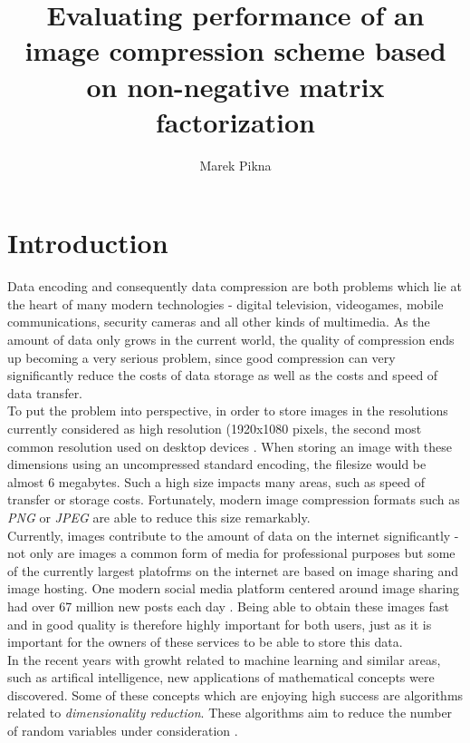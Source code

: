 \documentclass[thesis=M,english]{FITthesis}[2012/10/20]
\title{Evaluating performance of an image compression scheme based on non-negative matrix factorization}
\author{Marek Pikna} %
\begin{document}

\chapter{Introduction}
Data encoding and consequently data compression are both problems which lie
at the heart of many modern technologies - digital television, videogames, mobile
communications, security cameras and all other kinds of multimedia. As the amount
of data only grows in the current world, the quality of
compression ends up becoming a very serious problem, since good compression can
very significantly reduce the costs of data storage as well as the costs and speed
of data transfer.
\\

To put the problem into perspective, in order to store images in the resolutions
currently considered as high resolution (1920x1080 pixels, the second most common
resolution used on desktop devices \cite{res-stats}.
When storing an image with these dimensions using an uncompressed standard encoding,
the filesize would be almost 6 megabytes. Such a high size impacts many areas, such as
speed of transfer or storage costs. Fortunately, modern image compression formats such as
\emph{PNG} or \emph{JPEG} are able to reduce this size remarkably.
\\

Currently, images contribute to the amount of data on the internet significantly - not only are images a common
form of media for professional purposes but some of the currently largest platofrms on the
internet are based on image sharing and image hosting. One modern social media platform centered around image
sharing had over 67 million new posts each day \cite{data-amount}.
Being able to obtain these images fast and in good quality is therefore highly important for both users, just
as it is important for the owners of these services to be able to store this data.
\\

In the recent years with growht related to machine learning and similar areas, such as artifical
intelligence, new applications of mathematical concepts were discovered. Some of these concepts
which are enjoying high success are algorithms related to \emph{dimensionality reduction}. These
algorithms aim to reduce the number of random variables under consideration \cite{dimens-reduction}.
\\
\end{document}
